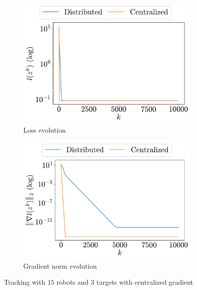 \documentclass[a4paper,11pt,oneside]{book}
\begin{document}
\begin{figure}[H]
      \centering
      \begin{subfigure}[t]{0.48\linewidth}
            \centering
            \includegraphics[width=\linewidth]{./figs/tracking/centralized/loss.pdf} 
            \caption{Loss evolution}
      \end{subfigure}
      \hfill
      \begin{subfigure}[t]{0.48\linewidth}
            \centering
            \includegraphics[width=\linewidth]{./figs/tracking/centralized/gradient.pdf} 
            \caption{Gradient norm evolution}
      \end{subfigure}
      \caption{Tracking with $15$ robots and $3$ targets with centralized gradient}
      \label{fig:tracking_centralized_5_3}
\end{figure}
\end{document}
